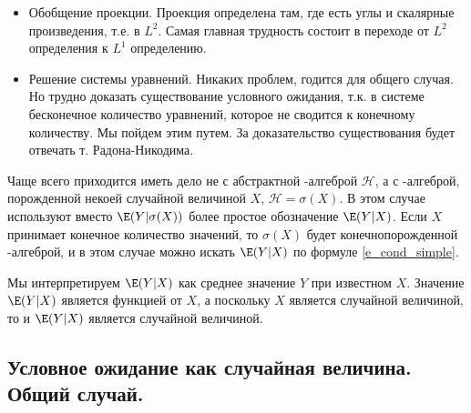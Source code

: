 {\begin{itemize}
\item Обобщение проекции. Проекция определена там, где есть углы и скалярные произведения, т.е. в $L^{2}$. Самая главная трудность состоит в переходе от $L^{2}$ определения к $L^{1}$ определению.

\item Решение системы уравнений. Никаких проблем, годится для общего случая. Но трудно доказать существование условного ожидания, т.к. в системе бесконечное количество уравнений, которое не сводится к конечному количеству. Мы пойдем этим путем. За доказательство существования будет отвечать т. Радона-Никодима.
\end{itemize}


Чаще всего приходится иметь дело не с абстрактной \s-алгеброй $\mathcal{H}$, а с \s-алгеброй, порожденной некоей случайной величиной $X$, $\mathcal{H}=\sigma(X)$. В этом случае используют вместо $\E(Y|\sigma(X))$ более простое обозначение $\E(Y|X)$. Если $X$ принимает конечное количество значений, то $\sigma(X)$ будет конечнопорожденной \s-алгеброй, и в этом случае можно искать $\E(Y|X)$ по формуле \ref{e_cond_simple}.

Мы интерпретируем $\E(Y|X)$ как среднее значение $Y$ при известном $X$. Значение $\E(Y|X)$ является функцией от $X$, а поскольку $X$ является случайной величиной, то и $\E(Y|X)$ является случайной величиной.


}\subsection{Условное ожидание как случайная величина. Общий случай.} 
